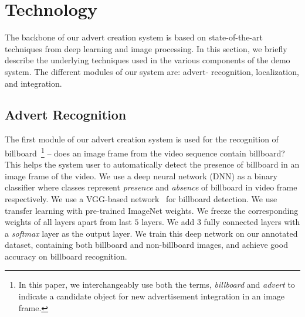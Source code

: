 \documentclass[runningheads]{llncs}
\begin{document}
\vspace{-0.2in}

\section{Technology}
\vspace{-0.1in}
The backbone of our advert creation system is based on state-of-the-art techniques from deep learning and image processing. In this section, we briefly describe the underlying techniques used in the various components of the demo system. The different modules of our system are: advert- recognition, localization, and integration. 

\vspace{-0.2in}

\subsection{Advert Recognition}
The first module of our advert creation system is used for the recognition of billboard~\footnote{In this paper, we interchangeably use both the terms, \emph{billboard} and \emph{advert} to indicate a candidate object for new advertisement integration in an image frame.} -- does an image frame from the video sequence contain billboard? This helps the system user to automatically detect the presence of billboard in an image frame of the video. We use a deep neural network (DNN) as a binary classifier where classes represent \emph{presence} and \emph{absence} of billboard in video frame respectively. We use a VGG-based network~\cite{simonyan2014very} for billboard detection. We use transfer learning with pre-trained ImageNet weights. We freeze the corresponding weights of all layers apart from last $5$ layers. We add $3$ fully connected layers with a \emph{softmax} layer as the output layer. We train this deep network on our annotated dataset, containing both billboard and non-billboard images, and achieve good accuracy on billboard recognition.


\end{document}

